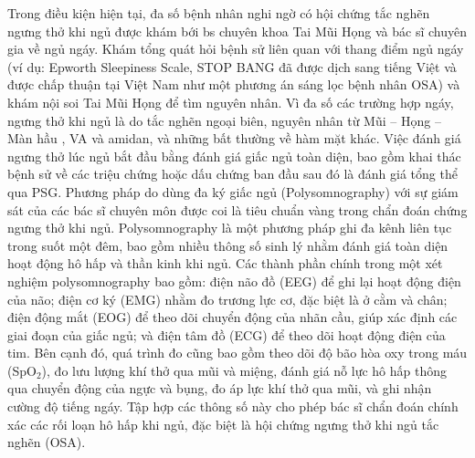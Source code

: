 Trong điều kiện hiện tại, đa số bệnh nhân nghi ngờ có hội chứng tắc nghẽn ngưng thở khi ngủ được khám bới bs chuyên khoa Tai Mũi Họng và bác sĩ chuyên gia về ngủ ngáy. Khám tổng quát hỏi bệnh sử liên quan với thang điểm ngủ ngáy (ví dụ: Epworth Sleepiness Scale, STOP BANG đã được dịch sang tiếng Việt và được chấp thuận tại Việt Nam như một phương án sáng lọc bệnh nhân OSA) và khám nội soi Tai Mũi Họng để tìm nguyên nhân. Vì đa số các trường hợp ngáy, ngưng thở khi ngủ là do tắc nghẽn ngoại biên, nguyên nhân từ Mũi – Họng – Màn hầu , VA và amidan, và những bất thường về hàm mặt khác. Việc đánh giá ngưng thở lúc ngủ bắt đầu bằng đánh giá giấc ngủ toàn diện, bao gồm khai thác bệnh sử về các triệu chứng hoặc dấu chứng ban đầu sau đó là đánh giá tổng thể qua PSG\cite{diagnosis_osa}\cite{medical2006polysomnography}.
Phương pháp do dùng đa ký giấc ngủ (Polysomnography) với sự giám sát của các bác sĩ chuyên môn được coi là tiêu chuẩn vàng trong chẩn đoán chứng ngưng thở khi ngủ. Polysomnography là một phương pháp ghi đa kênh liên tục trong suốt một đêm, bao gồm nhiều thông số sinh lý nhằm đánh giá toàn diện hoạt động hô hấp và thần kinh khi ngủ. Các thành phần chính trong một xét nghiệm polysomnography bao gồm: điện não đồ (EEG) để ghi lại hoạt động điện của não; điện cơ ký (EMG) nhằm đo trương lực cơ, đặc biệt là ở cằm và chân; điện động mắt (EOG) để theo dõi chuyển động của nhãn cầu, giúp xác định các giai đoạn của giấc ngủ; và điện tâm đồ (ECG) để theo dõi hoạt động điện của tim. Bên cạnh đó, quá trình đo cũng bao gồm theo dõi độ bão hòa oxy trong máu (SpO$_2$), đo lưu lượng khí thở qua mũi và miệng, đánh giá nỗ lực hô hấp thông qua chuyển động của ngực và bụng, đo áp lực khí thở qua mũi, và ghi nhận cường độ tiếng ngáy. Tập hợp các thông số này cho phép bác sĩ chẩn đoán chính xác các rối loạn hô hấp khi ngủ, đặc biệt là hội chứng ngưng thở khi ngủ tắc nghẽn (OSA).

